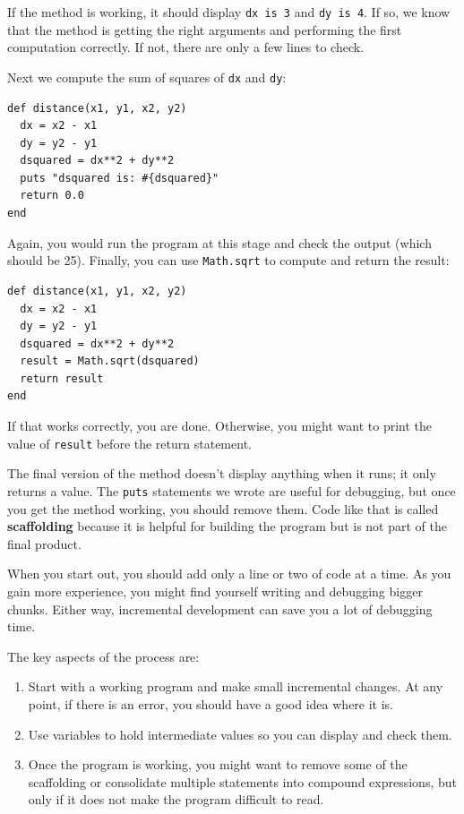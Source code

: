 \documentclass[10pt]{book}
\begin{document}
If the method is working, it should display \verb"dx is 3" and 
\verb"dy is 4".  If so, we know that the method is getting the right
arguments and performing the first computation correctly.  If not,
there are only a few lines to check.

Next we compute the sum of squares of {\tt dx} and {\tt dy}:

\begin{verbatim}
def distance(x1, y1, x2, y2)
  dx = x2 - x1
  dy = y2 - y1
  dsquared = dx**2 + dy**2
  puts "dsquared is: #{dsquared}"
  return 0.0
end
\end{verbatim}
%
Again, you would run the program at this stage and check the output
(which should be 25).
Finally, you can use {\tt Math.sqrt} to compute and return the result:

\begin{verbatim}
def distance(x1, y1, x2, y2)
  dx = x2 - x1
  dy = y2 - y1
  dsquared = dx**2 + dy**2
  result = Math.sqrt(dsquared)
  return result
end
\end{verbatim}
%
If that works correctly, you are done.  Otherwise, you might
want to print the value of {\tt result} before the return
statement.

The final version of the method doesn't display anything when it
runs; it only returns a value.  The {\tt puts} statements we wrote
are useful for debugging, but once you get the method working, you
should remove them.  Code like that is called {\bf scaffolding}
because it is helpful for building the program but is not part of the
final product.

When you start out, you should add only a line or two of code at a
time.  As you gain more experience, you might find yourself writing
and debugging bigger chunks.  Either way, incremental development
can save you a lot of debugging time.

The key aspects of the process are:

\begin{enumerate}

\item Start with a working program and make small incremental changes. 
At any point, if there is an error, you should have a good idea
where it is.

\item Use variables to hold intermediate values so you can
display and check them.

\item Once the program is working, you might want to remove some of
the scaffolding or consolidate multiple statements into compound
expressions, but only if it does not make the program difficult to
read.

\end{enumerate}
\end{document}

